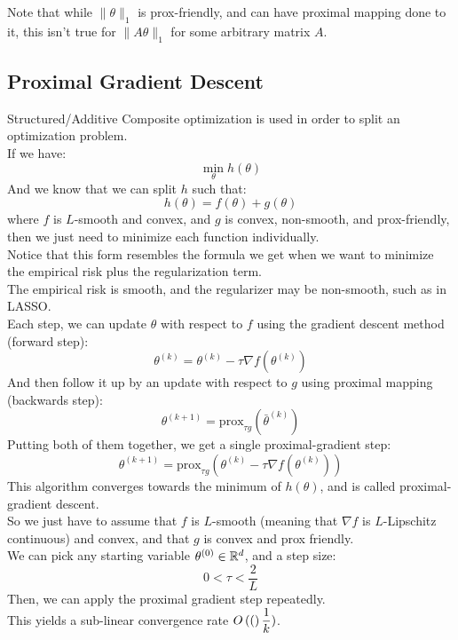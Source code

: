 \documentclass[12pt]{article}
\begin{document}
Note that while $\|\theta\|_1$
is prox-friendly, and can have proximal mapping
done to it,
this isn't true for $\|A \theta\|_1$
for some arbitrary matrix $A$. \\

\newpage

\subsection*{Proximal Gradient Descent}

Structured/Additive Composite optimization
is used in order to split an optimization problem. \\
If we have:
\[ \min_\theta h(\theta) \]
And we know that we can split $h$ such that:
\[ h(\theta) = f(\theta) + g(\theta)\]
where $f$ is $L$-smooth and convex,
and $g$ is convex,
non-smooth, and prox-friendly,
then we just need to minimize each
function individually. \\

Notice that this form
resembles the formula we get
when we want to minimize the empirical risk
plus the regularization term. \\
The empirical risk is smooth, and the regularizer
may be non-smooth, such as in LASSO. \\

Each step, we can update $\theta$
with respect to $f$ using the gradient
descent method (forward step):
\[ \theta^{(k)} = \theta^{(k)} - 
\tau \nabla f(\theta^{(k)}) \]
And then follow it up by an update
with respect to $g$ using proximal mapping
(backwards step):
\[ \theta^{(k+1)} = \text{prox}_{\tau g}
(\bar{\theta}^{(k)}) \]
Putting both of them together,
we get a single proximal-gradient step:
\[ \theta^{(k+1)} = \text{prox}_{\tau g} 
\left( \theta^{(k)} - \tau \nabla 
f(\theta^{(k)}) \right) \]
This algorithm converges towards
the minimum of $h(\theta)$,
and is called proximal-gradient descent. \\

So we just have to assume that $f$
is $L$-smooth (meaning that $\nabla f$
is $L$-Lipschitz continuous)
and convex, and that $g$
is convex and prox friendly. \\
We can pick any starting variable 
$\theta^{(0)} \in \mathbb{R}^d$,
and a step size:
\[ 0 < \tau < \dfrac{2}{L} \]
Then, we can apply the proximal gradient step
repeatedly. \\

This yields a sub-linear convergence rate
$O\left( ( \right)\dfrac{1}{k})$. \\
\end{document}
